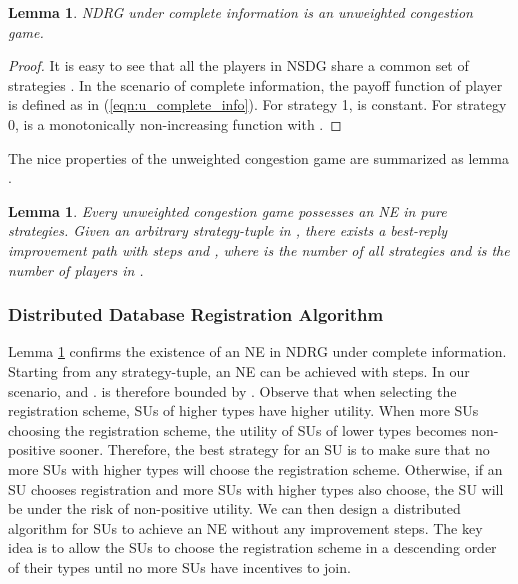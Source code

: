 \documentclass[journal]{IEEEtran}
\newtheorem{lemma}[theorem]{Lemma}
\begin{document}
\begin{lemma}
\label{lemma:NDRG_is_CG}
NDRG under complete information is an unweighted congestion game.
\end{lemma}
\begin{proof}
It is easy to see that all the players in NSDG share a common set of strategies . In the scenario of complete information, the payoff function of player  is defined as  in (\ref{eqn:u_complete_info}). For strategy 1,  is constant. For strategy 0,  is a monotonically non-increasing function with .
\end{proof}

The nice properties of the unweighted congestion game are summarized as lemma \cite{congestion_game}.
\begin{lemma}
\label{lemma:property_of_CG}
Every unweighted congestion game  possesses an NE in pure strategies. Given an arbitrary strategy-tuple  in , there exists a best-reply improvement path \cite{congestion_game} with  steps and , where  is the number of all strategies and  is the number of players in .
\end{lemma}

\subsubsection{Distributed Database Registration Algorithm}

Lemma \ref{lemma:property_of_CG} confirms the existence of an NE in NDRG under complete information. Starting from any strategy-tuple, an NE can be achieved with  steps. In our scenario,  and .  is therefore bounded by . Observe that when selecting the registration scheme, SUs of higher types have higher utility. When more SUs choosing the registration scheme, the utility of SUs of lower types becomes non-positive sooner. Therefore, the best strategy for an SU is to make sure that no more SUs with higher types will choose the registration scheme. Otherwise, if an SU chooses registration and more SUs with higher types also choose, the SU will be under the risk of non-positive utility. We can then design a distributed algorithm for SUs to achieve an NE without any improvement steps. The key idea is to allow the SUs to choose the registration scheme in a descending order of their types until no more SUs have incentives to join.
\end{document}
